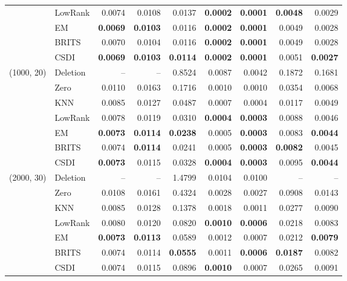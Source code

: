 {\begin{tabular}{@{}llrrrrrrr@{}}
 & LowRank & 0.0074 & 0.0108 & 0.0137 & \textbf{0.0002} & \textbf{0.0001} & \textbf{0.0048} & 0.0029 \\
 & EM & \textbf{0.0069} & \textbf{0.0103} & 0.0116 & \textbf{0.0002} & \textbf{0.0001} & 0.0049 & 0.0028 \\
 & BRITS & 0.0070 & 0.0104 & 0.0116 & \textbf{0.0002} & \textbf{0.0001} & 0.0049 & 0.0028 \\
 & CSDI & \textbf{0.0069} & \textbf{0.0103} & \textbf{0.0114} & \textbf{0.0002} & \textbf{0.0001} & 0.0051 & \textbf{0.0027} \\
\midrule
(1000, 20) & Deletion & -- & -- & 0.8524 & 0.0087 & 0.0042 & 0.1872 & 0.1681 \\
 & Zero & 0.0110 & 0.0163 & 0.1716 & 0.0010 & 0.0010 & 0.0354 & 0.0068 \\
 & KNN & 0.0085 & 0.0127 & 0.0487 & 0.0007 & 0.0004 & 0.0117 & 0.0049 \\
 & LowRank & 0.0078 & 0.0119 & 0.0310 & \textbf{0.0004} & \textbf{0.0003} & 0.0088 & 0.0046 \\
 & EM & \textbf{0.0073} & \textbf{0.0114} & \textbf{0.0238} & 0.0005 & \textbf{0.0003} & 0.0083 & \textbf{0.0044} \\
 & BRITS & 0.0074 & \textbf{0.0114} & 0.0241 & 0.0005 & \textbf{0.0003} & \textbf{0.0082} & 0.0045 \\
 & CSDI & \textbf{0.0073} & 0.0115 & 0.0328 & \textbf{0.0004} & \textbf{0.0003} & 0.0095 & \textbf{0.0044} \\
\midrule
(2000, 30) & Deletion & -- & -- & 1.4799 & 0.0104 & 0.0100 & -- & -- \\
 & Zero & 0.0108 & 0.0161 & 0.4324 & 0.0028 & 0.0027 & 0.0908 & 0.0143 \\
 & KNN & 0.0085 & 0.0128 & 0.1378 & 0.0018 & 0.0011 & 0.0277 & 0.0090 \\
 & LowRank & 0.0080 & 0.0120 & 0.0820 & \textbf{0.0010} & \textbf{0.0006} & 0.0218 & 0.0083 \\
 & EM & \textbf{0.0073} & \textbf{0.0113} & 0.0589 & 0.0012 & 0.0007 & 0.0212 & \textbf{0.0079} \\
 & BRITS & 0.0074 & 0.0114 & \textbf{0.0555} & 0.0011 & \textbf{0.0006} & \textbf{0.0187} & 0.0082 \\
 & CSDI & 0.0074 & 0.0115 & 0.0896 & \textbf{0.0010} & 0.0007 & 0.0265 & 0.0091 \\
\bottomrule
\end{tabular}}
